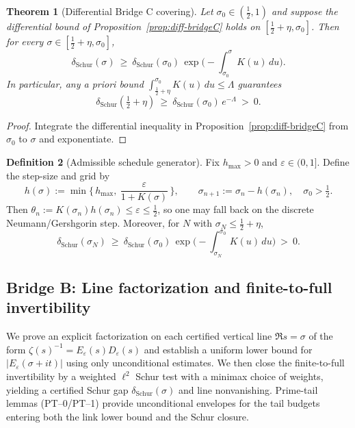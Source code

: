 \documentclass[11pt]{article}
\newtheorem{theorem}{Theorem}
\theoremstyle{definition}
\newtheorem{definition}[theorem]{Definition}
\theoremstyle{remark}
\begin{document}
\begin{theorem}[Differential Bridge C covering]\label{thm:diff-bridgeC}
Let $\sigma_0\in(\tfrac12,1)$ and suppose the differential bound of Proposition~\ref{prop:diff-bridgeC} holds on $[\tfrac12+\eta,\sigma_0]$. Then for every $\sigma\in[\tfrac12+\eta,\sigma_0]$,
\[
  \delta_{\mathrm{Schur}}(\sigma)\ \ge\ \delta_{\mathrm{Schur}}(\sigma_0)\,\exp\!\Big(-\int_{\sigma_0}^{\sigma} K(u)\,du\Big).
\]
In particular, any a priori bound $\int_{\tfrac12+\eta}^{\sigma_0}K(u)\,du\le \Lambda$ guarantees
\[
  \delta_{\mathrm{Schur}}(\tfrac12+\eta)\ \ge\ \delta_{\mathrm{Schur}}(\sigma_0)\,e^{-\Lambda}\ >\ 0.
\]
\end{theorem}

\begin{proof}
Integrate the differential inequality in Proposition~\ref{prop:diff-bridgeC} from $\sigma_0$ to $\sigma$ and exponentiate.
\end{proof}

\begin{definition}[Admissible schedule generator]\label{def:admissible-schedule}
Fix $h_{\max}>0$ and $\varepsilon\in(0,1]$. Define the step-size and grid by
\[
  h(\sigma):=\min\!\Big\{\,h_{\max},\ \frac{\varepsilon}{1+K(\sigma)}\,\Big\},\qquad \sigma_{n+1}:=\sigma_n-h(\sigma_n),\quad \sigma_0>\tfrac12.
\]
Then $\theta_n:=K(\sigma_n)h(\sigma_n)\le \varepsilon\le \tfrac12$, so one may fall back on the discrete Neumann/Gershgorin step. Moreover, for $N$ with $\sigma_N\le \tfrac12+\eta$,
\[
  \delta_{\mathrm{Schur}}(\sigma_N)\ \ge\ \delta_{\mathrm{Schur}}(\sigma_0)\,\exp\!\Big(-\int_{\sigma_N}^{\sigma_0} K(u)\,du\Big)\ >\ 0.
\]
\end{definition}
\subsection*{Bridge B: Line factorization and finite-to-full invertibility}
We prove an explicit factorization on each certified vertical line $\Re s=\sigma$ of the form $\zeta(s)^{-1}=E_\varepsilon(s)D_\varepsilon(s)$ and establish a uniform lower bound for $|E_\varepsilon(\sigma+it)|$ using only unconditional estimates. We then close the finite-to-full invertibility by a weighted $\ell^2$ Schur test with a minimax choice of weights, yielding a certified Schur gap $\delta_{\mathrm{Schur}}(\sigma)$ and line nonvanishing. Prime-tail lemmas (PT--0/PT--1) provide unconditional envelopes for the tail budgets entering both the link lower bound and the Schur closure.
\end{document}
